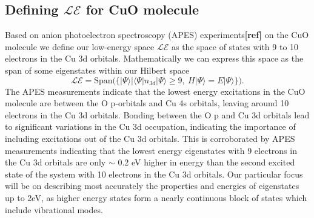 \documentclass{article}
\begin{document}
\pagebreak
\subsection{Defining $\mathcal{LE}$ for CuO molecule}
Based on anion photoelectron spectroscopy (APES) experiments\textbf{[ref]} on the CuO molecule we define our low-energy space $\mathcal{LE}$ as the space of states with 9 to 10 electrons in the Cu 3d orbitals. 
Mathematically we can express this space as the span of some eigenstates within our Hilbert space
\begin{equation}
\mathcal{LE} = \text{Span(}\{ |\Psi \rangle | \langle \Psi | n_{3d} | \Psi \rangle \ge 9,\ H|\Psi\rangle = E |\Psi\rangle \}\text{)}.
\end{equation}
The APES measurements indicate that the lowest energy excitations in the CuO molecule are between the O p-orbitals and Cu 4s orbitals, leaving around 10 electrons in the Cu 3d orbitals. 
Bonding between the O p and Cu 3d orbitals lead to significant variations in the Cu 3d occupation, indicating the importance of including excitations out of the Cu 3d orbitals. 
This is corroborated by APES measurements indicating that the lowest energy eigenstates with 9 electrons in the Cu 3d orbitals are only $\sim$ 0.2 eV higher in energy than the second excited state of the system with 10 electrons in the Cu 3d orbitals. 
Our particular focus will be on describing most accurately the properties and energies of eigenstates up to 2eV, as higher energy states form a nearly continuous block of states which include vibrational modes.

\pagebreak
\end{document}
